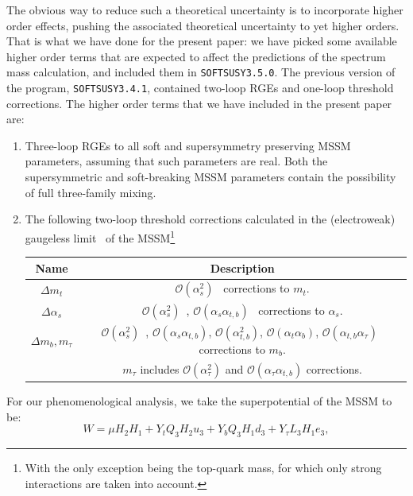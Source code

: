 \documentclass[final,3p,times,pdflatex]{elsarticle}
\begin{document}
The obvious way to reduce such a theoretical uncertainty is to incorporate
higher order effects, pushing the associated theoretical uncertainty to yet
higher orders.
That is what we have done for the present paper: we have
picked some available higher order terms that are expected to affect the
predictions of the spectrum mass calculation, and included them in
{\tt SOFTSUSY3.5.0}. The previous version of the program, {\tt SOFTSUSY3.4.1}, 
contained two-loop RGEs and one-loop threshold corrections. 
The higher order terms that we have included in the present paper are: 
\begin{enumerate}
\item
Three-loop RGEs \cite{Jack:2004ch} to all soft and supersymmetry preserving
MSSM parameters,  
assuming that such parameters are real. Both the supersymmetric and
soft-breaking MSSM 
parameters  
contain the possibility of full three-family mixing. 
\item
The following two-loop threshold
corrections calculated in the (electroweak) gaugeless limit~\cite{Haestier:2005ja} of the MSSM\footnote{With the only exception being the top-quark mass, for which only strong interactions are taken into account.}
\begin{center}
\begin{tabular}{|c|c|}\hline
Name & Description \\ \hline
$\Delta m_t$ & $\mathcal O(\alpha_s^2)$~\cite{Bednyakov:2002sf,Bednyakov:2005kt} corrections to $m_t$.  \\
$\Delta \alpha_s$ & $\mathcal O(\alpha_s^2)$~\cite{Harlander:2005wm,Bauer:2008bj}, $\mathcal O(\alpha_s \alpha_{t,b})$~\cite{Bednyakov:2010ni} corrections to $\alpha_s$. \\
$\Delta m_b, m_\tau$ & $\mathcal O(\alpha_s^2)$~\cite{Bauer:2008bj,Bednyakov:2007vm}, $\mathcal O(\alpha_s \alpha_{t,b})$, $\mathcal O(\alpha_{t,b}^2)$, $\mathcal O(\alpha_t \alpha_b)$, 
$\mathcal O(\alpha_{t,b} \alpha_\tau)$~\cite{Bednyakov:2009wt} corrections to $m_b$. \\ &
$m_\tau$ includes $\mathcal O(\alpha_\tau^2)$  and $\mathcal O(\alpha_\tau \alpha_{t,b})$ \cite{Bednyakov:2009wt} corrections. 
 \\
\hline \end{tabular}
\end{center}
\end{enumerate}
For our phenomenological analysis, we take the superpotential of the MSSM to be:
\begin{equation}
W=\mu H_2 H_1 + Y_t Q_3 H_2 u_3 + Y_b Q_3 H_1 d_3 + Y_\tau L_3 H_1 e_3,
\end{equation}
\end{document}
